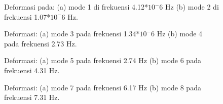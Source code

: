 \begin{figure}[H]
	\begin{subfigure}{0.49\textwidth}
		\centering
		\caption{}
		\label{fig:mode1}
	\end{subfigure}
	\centering
	\begin{subfigure}{0.49\textwidth}
		\centering
		\caption{}
		\label{fig:mode2}
	\end{subfigure}
	\caption{Deformasi pada: (a) mode 1 di frekuensi 4.12*$10^-6$ Hz (b) mode 2 di frekuensi 1.07*$10^-6$ Hz.}
\end{figure}

\begin{figure}[H]
	\begin{subfigure}{0.49\textwidth}
		\centering
		\caption{}
		\label{fig:mode3}
	\end{subfigure}
	\centering
	\begin{subfigure}{0.49\textwidth}
		\centering
		\caption{}
		\label{fig:mode4}
	\end{subfigure}
	\caption{Deformasi: (a) mode 3 pada frekuensi 1.34*$10^-6$ Hz (b) mode 4 pada frekuensi 2.73 Hz.}
\end{figure}

\begin{figure}[H]
	\begin{subfigure}{0.49\textwidth}
		\centering
		\caption{}
		\label{fig:mode5}
	\end{subfigure}
	\centering
	\begin{subfigure}{0.49\textwidth}
		\centering
		\caption{}
		\label{fig:mode6}
	\end{subfigure}
	\caption{Deformasi: (a) mode 5 pada frekuensi 2.74 Hz (b) mode 6 pada frekuensi 4.31 Hz.}
\end{figure}

\begin{figure}[H]
	\begin{subfigure}{0.49\textwidth}
		\centering
		\caption{}
		\label{fig:mode7}
	\end{subfigure}
	\centering
	\begin{subfigure}{0.49\textwidth}
		\centering
		\caption{}
		\label{fig:mode8}
	\end{subfigure}
	\caption{Deformasi: (a) mode 7 pada frekuensi 6.17 Hz (b) mode 8 pada frekuensi 7.31 Hz.}
\end{figure}

